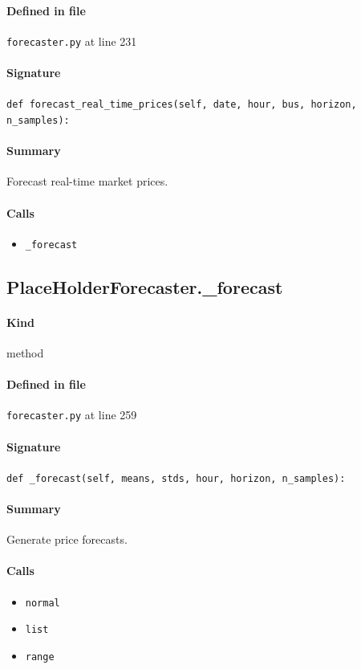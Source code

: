 \documentclass[11pt]{report}
\begin{document}
\paragraph{Defined in file} \texttt{forecaster.py} at line 231
\paragraph{Signature} \texttt{def forecast\_real\_time\_prices(self, date, hour, bus, horizon, n\_samples):}
\paragraph{Summary} Forecast real-time market prices.
\paragraph{Calls}
\begin{itemize}[leftmargin=*]
  \item \texttt{\_forecast}
\end{itemize}
\subsection{PlaceHolderForecaster.\_forecast}
\label{def:forecaster.py:PlaceHolderForecaster._forecast:L259}
\paragraph{Kind} method
\paragraph{Defined in file} \texttt{forecaster.py} at line 259
\paragraph{Signature} \texttt{def \_forecast(self, means, stds, hour, horizon, n\_samples):}
\paragraph{Summary} Generate price forecasts.
\paragraph{Calls}
\begin{itemize}[leftmargin=*]
  \item \texttt{normal}
  \item \texttt{list}
  \item \texttt{range}
\end{itemize}
\end{document}
